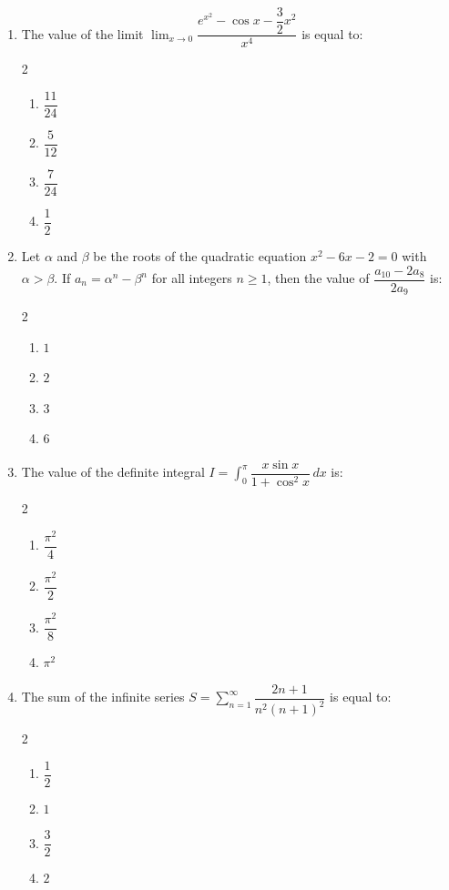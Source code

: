 \documentclass[11pt,a4paper]{article}
\begin{document}
\begin{enumerate}[label=\textbf{\arabic*.},leftmargin=18pt,itemsep=12pt]
  \item The value of the limit $\lim_{x \to 0} \dfrac{e^{x^2} - \cos x - \dfrac{3}{2}x^2}{x^4}$ is equal to:
  \begin{multicols}{2}
    \begin{enumerate}[label=(\Alph*)]
      \item $\dfrac{11}{24}$
      \item $\dfrac{5}{12}$
      \item $\dfrac{7}{24}$
      \item $\dfrac{1}{2}$
    \end{enumerate}
  \end{multicols}

  \item Let $\alpha$ and $\beta$ be the roots of the quadratic equation $x^2 - 6x - 2 = 0$ with $\alpha > \beta$. If $a_n = \alpha^n - \beta^n$ for all integers $n \ge 1$, then the value of $\dfrac{a_{10} - 2a_8}{2a_9}$ is:
  \begin{multicols}{2}
    \begin{enumerate}[label=(\Alph*)]
      \item $1$
      \item $2$
      \item $3$
      \item $6$
    \end{enumerate}
  \end{multicols}

  \item The value of the definite integral $I = \displaystyle\int_{0}^{\pi} \dfrac{x \sin x}{1 + \cos^2 x}\, dx$ is:
  \begin{multicols}{2}
    \begin{enumerate}[label=(\Alph*)]
      \item $\dfrac{\pi^2}{4}$
      \item $\dfrac{\pi^2}{2}$
      \item $\dfrac{\pi^2}{8}$
      \item $\pi^2$
    \end{enumerate}
  \end{multicols}

  \item The sum of the infinite series $S = \displaystyle\sum_{n=1}^{\infty} \dfrac{2n + 1}{n^2(n + 1)^2}$ is equal to:
  \begin{multicols}{2}
    \begin{enumerate}[label=(\Alph*)]
      \item $\dfrac{1}{2}$
      \item $1$
      \item $\dfrac{3}{2}$
      \item $2$
    \end{enumerate}
  \end{multicols}


\end{enumerate}
\end{document}

